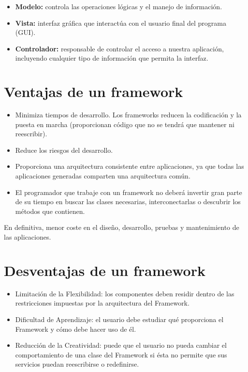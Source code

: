 \begin{itemize}
\item \textbf{Modelo:} controla las operaciones lógicas y el manejo de información.
\item \textbf{Vista:} interfaz gráfica que interactúa con el usuario final del programa (GUI). 
\item \textbf{Controlador:} responsable de controlar el acceso a nuestra aplicación, incluyendo cualquier tipo de información que permita la interfaz.
\end{itemize}

\section{Ventajas de un framework}

\begin{itemize}
\item Minimiza tiempos de desarrollo. Los frameworks reducen la codificación y la puesta en marcha (proporcionan código que no se tendrá que mantener ni reescribir).
\item Reduce los riesgos del desarrollo.
\item Proporciona una arquitectura consistente entre aplicaciones, ya que todas las aplicaciones generadas comparten una arquitectura común. 
\item El programador que trabaje con un framework no deberá invertir gran parte de su tiempo en buscar las clases necesarias, interconectarlas o descubrir los métodos que contienen.
\end{itemize}
En definitiva, menor coste en el diseño, desarrollo, pruebas y mantenimiento de las aplicaciones.

\section{Desventajas de un framework}

\begin{itemize}
\item Limitación de la Flexibilidad: los componentes deben residir dentro de las restricciones impuestas por la arquitectura del Framework.
\item Dificultad de Aprendizaje: el usuario debe estudiar qué proporciona el Framework y cómo debe hacer uso de él.
\item Reducción de la Creatividad: puede que el usuario no pueda cambiar el comportamiento de una clase del Framework si ésta no permite que sus servicios puedan reescribirse o redefinirse.
\end{itemize}
